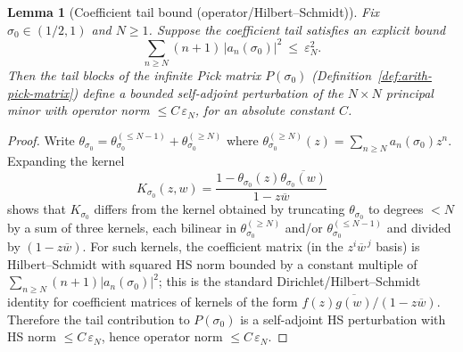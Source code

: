 \documentclass[11pt]{article}
\newtheorem{lemma}[theorem]{Lemma}
\theoremstyle{definition}
\theoremstyle{remark}
\theoremstyle{definition}
\begin{document}
\begin{lemma}[Coefficient tail bound (operator/Hilbert--Schmidt)]\label{lem:pick-tail-perturbation}
Fix $\sigma_0\in(1/2,1)$ and $N\ge 1$. Suppose the coefficient tail satisfies an explicit bound
\[
  \sum_{n\ge N} (n+1)\,|a_n(\sigma_0)|^2\ \le\ \varepsilon_N^2.
\]
Then the tail blocks of the infinite Pick matrix $P(\sigma_0)$ (Definition~\ref{def:arith-pick-matrix}) define a bounded self-adjoint perturbation of the $N\times N$ principal minor with operator norm $\le C\,\varepsilon_N$, for an absolute constant $C$.
\end{lemma}
\begin{proof}
Write $\theta_{\sigma_0}=\theta_{\sigma_0}^{(\le N-1)}+\theta_{\sigma_0}^{(\ge N)}$ where
$\theta_{\sigma_0}^{(\ge N)}(z)=\sum_{n\ge N} a_n(\sigma_0) z^n$.
Expanding the kernel
\[
  K_{\sigma_0}(z,w)=\frac{1-\theta_{\sigma_0}(z)\overline{\theta_{\sigma_0}(w)}}{1-z\overline w}
\]
shows that $K_{\sigma_0}$ differs from the kernel obtained by truncating $\theta_{\sigma_0}$ to degrees $<N$ by a sum of three kernels, each bilinear in $\theta_{\sigma_0}^{(\ge N)}$ and/or $\theta_{\sigma_0}^{(\le N-1)}$ and divided by $(1-z\overline w)$.
For such kernels, the coefficient matrix (in the $z^i\overline w^{\,j}$ basis) is Hilbert--Schmidt with squared HS norm bounded by a constant multiple of
$\sum_{n\ge N}(n+1)|a_n(\sigma_0)|^2$; this is the standard Dirichlet/Hilbert--Schmidt identity for coefficient matrices of kernels of the form
$f(z)\overline{g(w)}/(1-z\overline w)$.
Therefore the tail contribution to $P(\sigma_0)$ is a self-adjoint HS perturbation with HS norm $\le C\,\varepsilon_N$, hence operator norm $\le C\,\varepsilon_N$.
\end{proof}
\end{document}
